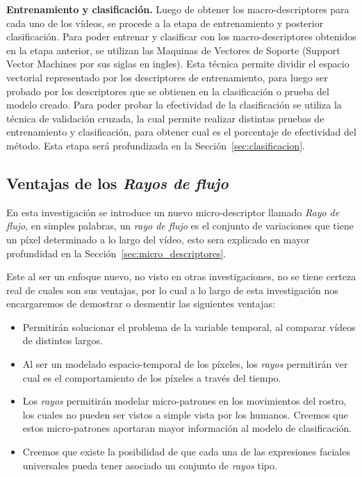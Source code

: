 \textbf{Entrenamiento y clasificación.}
Luego de obtener los macro-des\-crip\-tores para cada uno de los vídeos, se procede a la etapa de entrenamiento y posterior clasificación. Para poder entrenar y clasificar con los macro-descriptores obtenidos en la etapa anterior, se utilizan las Maquinas de Vectores de Soporte (Support Vector Machines por sus siglas en ingles). Esta técnica permite dividir el espacio vectorial representado por los descriptores de entrenamiento, para luego ser probado por los descriptores que se obtienen en la clasificación o prueba del modelo creado. Para poder probar la efectividad de la clasificación se utiliza la técnica de validación cruzada, la cual permite realizar distintas pruebas de entrenamiento y clasificación, para obtener cual es el porcentaje de efectividad del método. Esta etapa será profundizada en la Sección~\ref{sec:clasificacion}.

\subsection{Ventajas de los \textit{Rayos de flujo}}
En esta investigación se introduce un nuevo micro-descriptor llamado \textit{Rayo de flujo}, en simples palabras, 
un \textit{rayo de flujo} es el conjunto de variaciones que tiene un píxel determinado a lo largo del vídeo, esto sera explicado en mayor profundidad en la Sección~\ref{sec:micro_descriptores}.

Este al ser un enfoque nuevo, no visto en otras investigaciones, no se tiene certeza real de cuales son sus ventajas, por lo cual a lo largo de esta investigación nos encargaremos de demostrar o desmentir las siguientes ventajas:

\begin{itemize}
	\item Permitirán solucionar el problema de la variable temporal, al comparar vídeos de distintos largos.
	\item Al ser un modelado espacio-temporal de los píxeles, los \textit{rayos} permitirán ver cual es el comportamiento de los píxeles a través del tiempo.
	\item Los \textit{rayos} permitirán modelar micro-patrones en los movimientos del rostro, los cuales no pueden ser vistos a simple vista por los humanos. Creemos que estos micro-patrones aportaran mayor información al modelo de clasificación.
	\item Creemos que existe la posibilidad de que cada una de las expresiones faciales universales pueda tener asociado un conjunto de \textit{rayos} tipo. 
\end{itemize}



